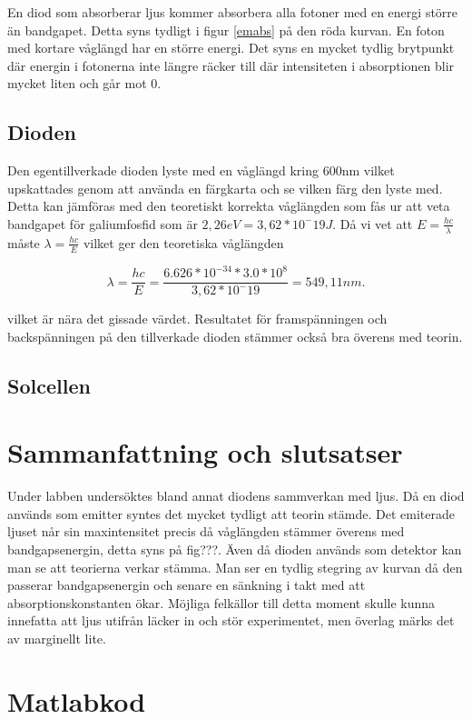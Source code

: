 \documentclass[a4paper]{article}
\begin{document}
En diod som absorberar ljus kommer absorbera alla fotoner med en energi större än bandgapet. Detta syns tydligt i figur \ref{emabs} på den röda kurvan. En foton med kortare våglängd har en större energi. Det syns en mycket tydlig brytpunkt där energin i fotonerna inte längre räcker till där intensiteten i absorptionen blir mycket liten och går mot 0. 

\subsection{Dioden}
Den egentillverkade dioden lyste med en våglängd kring 600nm vilket upskattades genom att använda en färgkarta och se vilken färg den lyste med. Detta kan jämföras med den teoretiskt korrekta våglängden som fås ur att veta bandgapet för galiumfosfid som är $2,26eV = 3,62*10^-19J$. Då vi vet att $E = \frac{hc}{\lambda}$ måste $\lambda = \frac{hc}{E}$ vilket ger den teoretiska våglängden

\begin{equation}
	\lambda = \frac{hc}{E} = \frac{6.626*10^{-34} * 3.0*10^8}{3,62*10^-19} = 549,11 nm.
\end{equation}

vilket är nära det gissade värdet. Resultatet för framspänningen och backspänningen på den tillverkade dioden stämmer också bra överens med teorin.

\subsection{Solcellen}

\section{Sammanfattning och slutsatser}
Under labben undersöktes bland annat diodens sammverkan med ljus. Då en diod används som emitter syntes det mycket tydligt att teorin stämde. Det emiterade ljuset når sin maxintensitet precis då våglängden stämmer överens med bandgapsenergin, detta syns på fig???. Även då dioden används som detektor kan man se att teorierna verkar stämma. Man ser en tydlig stegring av kurvan då den passerar bandgapsenergin och senare en sänkning i takt med att absorptionskonstanten ökar. Möjliga felkällor till detta moment skulle kunna innefatta att ljus utifrån läcker in och stör experimentet, men överlag märks det av marginellt lite. 

\newpage
\appendix
\section{Matlabkod}
\end{document}
